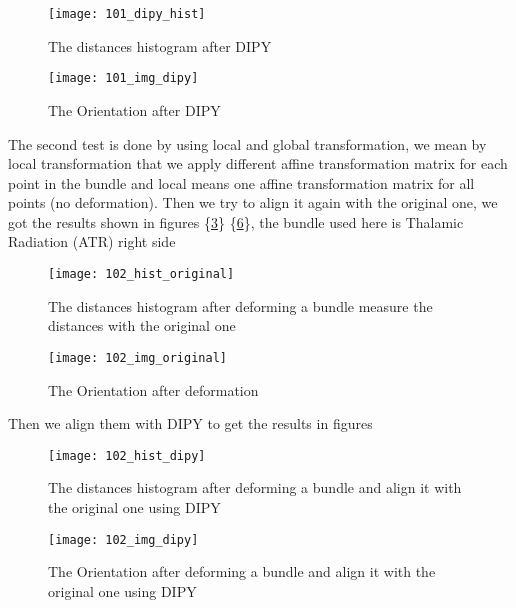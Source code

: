 \documentclass[../structure.tex]{subfiles}
\begin{document}
\begin{figure}[h!]
\centering
\texttt{[image: 101\_dipy\_hist]}
\captionsetup{justification=centering}
\caption{The distances histogram after DIPY}
\label{fig:dipy_hist}
\end{figure}

\begin{figure}[h!]
\centering
\texttt{[image: 101\_img\_dipy]}
\captionsetup{justification=centering}
\caption{The Orientation after DIPY}
\label{fig:img_dipy}
\end{figure}
\pagebreak

The second test is done by using local and global transformation, we mean by local transformation that we apply different affine transformation matrix for each point in the bundle and local means one affine transformation matrix for all points (no deformation). Then we try to align it again with the original one, we got the results shown in figures \{\ref{fig:hist_original_def}\} \{\ref{fig:img_original_def}\}, the bundle used here is Thalamic Radiation (ATR) right side

\begin{figure}[h!]
\centering
\texttt{[image: 102\_hist\_original]}
\captionsetup{justification=centering}
\caption{The distances histogram after deforming a bundle measure the distances with the original one}
\label{fig:hist_original_def}
\end{figure}

\begin{figure}[h!]
\centering
\texttt{[image: 102\_img\_original]}
\captionsetup{justification=centering}
\caption{The Orientation after deformation}
\label{fig:img_original_def}
\end{figure}
\pagebreak

Then we align them with DIPY to get the results in figures 

\begin{figure}[h!]
\centering
\texttt{[image: 102\_hist\_dipy]}
\captionsetup{justification=centering}
\caption{The distances histogram after deforming a bundle and align it with the original one using DIPY}
\label{fig:hist_dipy_def}
\end{figure}

\begin{figure}[h!]
\centering
\texttt{[image: 102\_img\_dipy]}
\captionsetup{justification=centering}
\caption{The Orientation after deforming a bundle and align it with the original one using DIPY}
\label{fig:img_original_def}
\end{figure}
\end{document}
